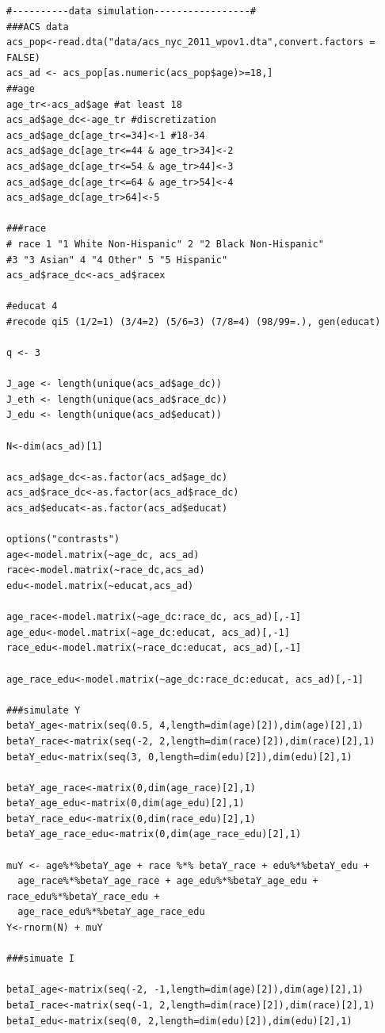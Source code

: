 \documentclass[11pt]{article}
\begin{document}
\begin{small}\begin{verbatim}
#----------data simulation-----------------#
###ACS data
acs_pop<-read.dta("data/acs_nyc_2011_wpov1.dta",convert.factors = FALSE)
acs_ad <- acs_pop[as.numeric(acs_pop$age)>=18,] 
##age
age_tr<-acs_ad$age #at least 18
acs_ad$age_dc<-age_tr #discretization
acs_ad$age_dc[age_tr<=34]<-1 #18-34
acs_ad$age_dc[age_tr<=44 & age_tr>34]<-2
acs_ad$age_dc[age_tr<=54 & age_tr>44]<-3
acs_ad$age_dc[age_tr<=64 & age_tr>54]<-4
acs_ad$age_dc[age_tr>64]<-5

###race
# race 1 "1 White Non-Hispanic" 2 "2 Black Non-Hispanic" 
#3 "3 Asian" 4 "4 Other" 5 "5 Hispanic"
acs_ad$race_dc<-acs_ad$racex

#educat 4
#recode qi5 (1/2=1) (3/4=2) (5/6=3) (7/8=4) (98/99=.), gen(educat)

q <- 3

J_age <- length(unique(acs_ad$age_dc))
J_eth <- length(unique(acs_ad$race_dc))
J_edu <- length(unique(acs_ad$educat))

N<-dim(acs_ad)[1]

acs_ad$age_dc<-as.factor(acs_ad$age_dc)
acs_ad$race_dc<-as.factor(acs_ad$race_dc)
acs_ad$educat<-as.factor(acs_ad$educat)

options("contrasts")
age<-model.matrix(~age_dc, acs_ad)
race<-model.matrix(~race_dc,acs_ad)
edu<-model.matrix(~educat,acs_ad)

age_race<-model.matrix(~age_dc:race_dc, acs_ad)[,-1]
age_edu<-model.matrix(~age_dc:educat, acs_ad)[,-1]
race_edu<-model.matrix(~race_dc:educat, acs_ad)[,-1]

age_race_edu<-model.matrix(~age_dc:race_dc:educat, acs_ad)[,-1]

###simulate Y
betaY_age<-matrix(seq(0.5, 4,length=dim(age)[2]),dim(age)[2],1)
betaY_race<-matrix(seq(-2, 2,length=dim(race)[2]),dim(race)[2],1)
betaY_edu<-matrix(seq(3, 0,length=dim(edu)[2]),dim(edu)[2],1)

betaY_age_race<-matrix(0,dim(age_race)[2],1)
betaY_age_edu<-matrix(0,dim(age_edu)[2],1)
betaY_race_edu<-matrix(0,dim(race_edu)[2],1)
betaY_age_race_edu<-matrix(0,dim(age_race_edu)[2],1)

muY <- age%*%betaY_age + race %*% betaY_race + edu%*%betaY_edu + 
  age_race%*%betaY_age_race + age_edu%*%betaY_age_edu + race_edu%*%betaY_race_edu + 
  age_race_edu%*%betaY_age_race_edu 
Y<-rnorm(N) + muY

###simuate I

betaI_age<-matrix(seq(-2, -1,length=dim(age)[2]),dim(age)[2],1)
betaI_race<-matrix(seq(-1, 2,length=dim(race)[2]),dim(race)[2],1)
betaI_edu<-matrix(seq(0, 2,length=dim(edu)[2]),dim(edu)[2],1)


\end{verbatim}
\end{small}
\end{document}

